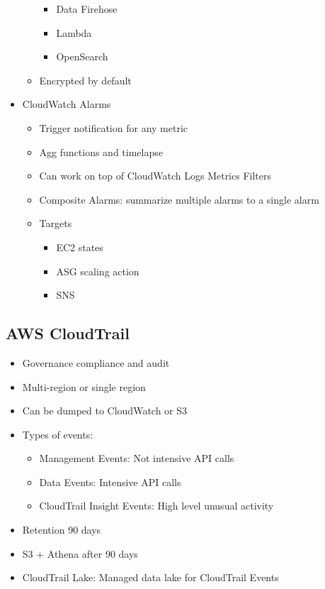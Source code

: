 \documentclass[../../main.tex]{subfiles}
\begin{document}
\begin{itemize}
\begin{itemize}
\begin{itemize}
            \item Data Firehose
            \item Lambda
            \item OpenSearch
        \end{itemize}
        \item Encrypted by default
    \end{itemize}
    \item CloudWatch Alarms
    \begin{itemize}
        \item Trigger notification for any metric
        \item Agg functions and timelapse
        \item Can work on top of CloudWatch Logs Metrics Filters
        \item Composite Alarms: summarize multiple alarms to a single alarm
        \item Targets
        \begin{itemize}
            \item EC2 states
            \item ASG scaling action
            \item SNS
        \end{itemize}
    \end{itemize}
\end{itemize}

\subsection{AWS CloudTrail}
\begin{itemize}
    \item Governance compliance and audit
    \item Multi-region or single region
    \item Can be dumped to CloudWatch or S3
    \item Types of events:
    \begin{itemize}
        \item Management Events: Not intensive API calls
        \item Data Events: Intensive API calls
        \item CloudTrail Insight Events: High level unusual activity
    \end{itemize}
    \item Retention 90 days
    \item S3 + Athena after 90 days
    \item CloudTrail Lake: Managed data lake for CloudTrail Events
\end{itemize}
\end{document}

